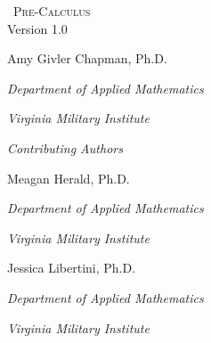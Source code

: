 
\hskip 125pt\begin{minipage}{\textwidth}
\begin{flushright}

\textsc{\large \apex\ {\Huge Pre-Calculus}} \\

{\small Version 1.0}\\

\Large
\vspace{1in}

Amy Givler Chapman, Ph.D.

\emph{\small Department of Applied Mathematics}

\emph{\small Virginia Military Institute}\vskip15pt

\parbox{200pt}{\textit{Contributing Authors}}\hskip 2cm \phantom{.}

Meagan Herald, Ph.D.

\emph{\small Department of Applied Mathematics}

\emph{\small Virginia Military Institute}\vskip 15pt

Jessica Libertini, Ph.D.

\emph{\small Department of Applied Mathematics}

\emph{\small Virginia Military Institute}\vskip15pt

%

\normalsize
\end{flushright}
\end{minipage}


